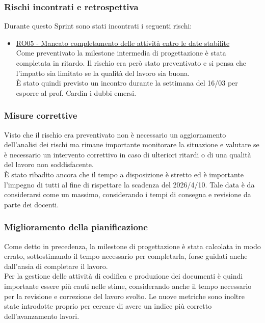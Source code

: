 \documentclass[a4paper,12pt]{article}
\begin{document}
\subsubsection{Rischi incontrati e retrospettiva}
Durante questo Sprint sono stati incontrati i seguenti rischi:
\begin{itemize}
    \item \hyperref[RO05]{RO05 - Mancato completamento delle attività entro le date stabilite} 
    \\Come preventivato la milestone intermedia di progettazione è stata completata in ritardo. Il rischio era però stato preventivato e si pensa che l'impatto sia limitato se la qualità del lavoro sia buona. 
    \\È stato quindi previsto un incontro durante la settimana del 16/03 per esporre al prof. Cardin i dubbi emersi.
\end{itemize}

\subsubsection{Misure correttive}
Visto che il rischio era preventivato non è necessario un aggiornamento dell'analisi dei rischi ma rimane importante monitorare la situazione e valutare se è necessario un intervento correttivo in caso di ulteriori ritardi o di una qualità del lavoro non soddisfacente.
\\È stato ribadito ancora che il tempo a disposizione è stretto ed è importante l'impegno di tutti al fine di rispettare la scadenza del 2026/4/10. Tale data è da considerarsi come un massimo, considerando i tempi di consegna e revisione da parte dei docenti.

\subsubsection{Miglioramento della pianificazione}
Come detto in precedenza, la milestone di progettazione è stata calcolata in modo errato, sottostimando il tempo necessario per completarla, forse guidati anche dall'ansia di completare il lavoro.
\\ Per la gestione delle attività di codifica e produzione dei documenti è quindi importante essere più cauti nelle stime, considerando anche il tempo necessario per la revisione e correzione del lavoro svolto.
Le nuove metriche sono inoltre state introdotte proprio per cercare di avere un indice più corretto dell'avanzamento lavori.
\end{document}

